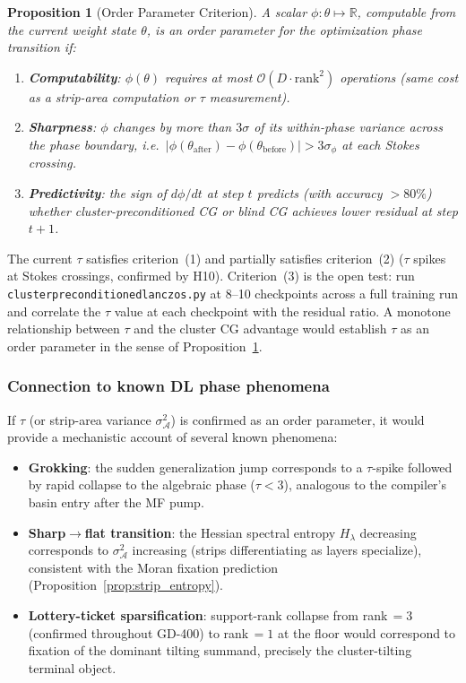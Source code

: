 \documentclass[11pt]{amsart}
\newtheorem{proposition}[theorem]{Proposition}
\begin{document}
\begin{proposition}[Order Parameter Criterion]
\label{prop:order_param}
A scalar $\phi: \theta \mapsto \mathbb{R}$, computable from the
current weight state $\theta$, is an order parameter for the
optimization phase transition if:
\begin{enumerate}
\item \textbf{Computability}: $\phi(\theta)$ requires at most
  $\mathcal{O}(D \cdot \mathrm{rank}^2)$ operations
  (same cost as a strip-area computation or $\tau$ measurement).
\item \textbf{Sharpness}: $\phi$ changes by more than $3\sigma$ of
  its within-phase variance across the phase boundary,
  i.e.\ $|\phi(\theta_\mathrm{after}) - \phi(\theta_\mathrm{before})|
  > 3\sigma_\phi$ at each Stokes crossing.
\item \textbf{Predictivity}: the sign of $d\phi/dt$ at step $t$
  predicts (with accuracy $>80\%$) whether cluster-preconditioned CG
  or blind CG achieves lower residual at step $t+1$.
\end{enumerate}
\end{proposition}

The current $\tau$ satisfies criterion~(1) and partially satisfies
criterion~(2) ($\tau$ spikes at Stokes crossings, confirmed by H10).
Criterion~(3) is the open test: run
\texttt{cluster\discretionary{\_}{}{\_}preconditioned\discretionary{\_}{}{\_}lanczos.py}
at 8--10 checkpoints across a full training run and correlate the
$\tau$ value at each checkpoint with the residual ratio.
A monotone relationship between $\tau$ and the cluster CG advantage
would establish $\tau$ as an order parameter in the sense of
Proposition~\ref{prop:order_param}.

\subsubsection*{Connection to known DL phase phenomena}

If $\tau$ (or strip-area variance $\sigma^2_\mathcal{A}$) is
confirmed as an order parameter, it would provide a mechanistic
account of several known phenomena:
\begin{itemize}
\item \textbf{Grokking}: the sudden generalization jump corresponds
  to a $\tau$-spike followed by rapid collapse to the algebraic
  phase ($\tau < 3$), analogous to the compiler's basin entry
  after the MF pump.
\item \textbf{Sharp$\to$flat transition}: the Hessian spectral
  entropy $H_\lambda$ decreasing corresponds to $\sigma^2_\mathcal{A}$
  increasing (strips differentiating as layers specialize),
  consistent with the Moran fixation prediction
  (Proposition~\ref{prop:strip_entropy}).
\item \textbf{Lottery-ticket sparsification}: support-rank collapse
  from rank\,$=3$ (confirmed throughout GD-400) to rank\,$=1$
  at the floor would correspond to fixation of the dominant tilting
  summand, precisely the cluster-tilting terminal object.
\end{itemize}
\end{document}
